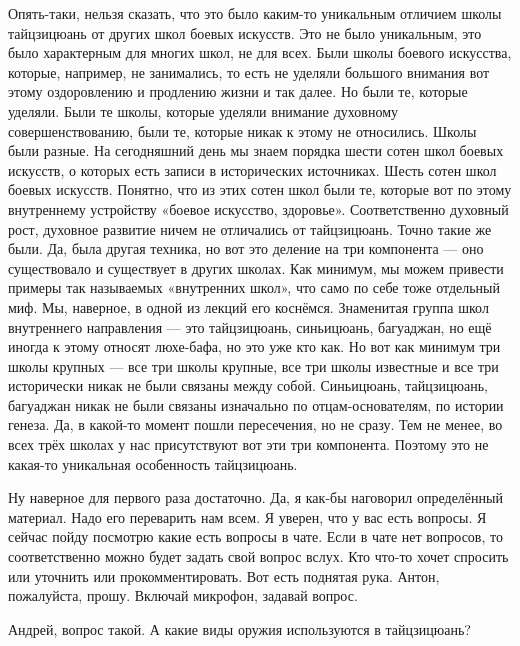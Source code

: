 Опять-таки, нельзя сказать, что это было каким-то уникальным отличием школы тайцзицюань от других
школ боевых искусств. Это не было уникальным, это было характерным для 
многих школ, не для всех. Были школы боевого искусства, которые, например, не занимались, то 
есть не уделяли большого внимания вот этому оздоровлению и продлению жизни и так далее. Но 
были те, которые уделяли. Были те школы, которые уделяли внимание духовному 
совершенствованию, были те, которые никак к этому не относились. Школы были разные. На 
сегодняшний день мы знаем порядка шести сотен школ боевых искусств, о которых есть записи в 
исторических источниках. Шесть сотен школ боевых искусств. Понятно, что из этих сотен школ 
были те, которые вот по этому внутреннему устройству «боевое искусство, здоровье».
Соответственно духовный рост, духовное развитие ничем не отличались от тайцзицюань. Точно такие же
были. Да, была другая техника, но вот это деление на три компонента --- оно 
существовало и существует в других школах. Как минимум, мы можем привести примеры так 
называемых «внутренних школ», что само по себе тоже отдельный миф. Мы, наверное, в одной из 
лекций его коснёмся. Знаменитая группа школ внутреннего направления --- это тайцзицюань, 
синьицюань, багуаджан, но ещё иногда к этому относят люхе-бафа, но это уже кто как. Но вот как 
минимум три школы крупных --- все три школы крупные, все три школы известные и все три 
исторически никак не были связаны между собой. Синьицюань, тайцзицюань, багуаджан никак 
не были связаны изначально по отцам-основателям, по истории генеза. Да, в какой-то момент пошли 
пересечения, но не сразу. Тем не менее, во всех трёх школах у нас присутствуют вот эти три 
компонента. Поэтому это не какая-то уникальная особенность тайцзицюань.

Ну наверное для 
первого раза достаточно. Да, я как-бы наговорил определённый материал. Надо его переварить нам 
всем. Я уверен, что у вас есть вопросы. Я сейчас пойду посмотрю какие есть 
вопросы в чате. Если в чате нет вопросов, то соответственно можно будет 
задать свой вопрос вслух. Кто 
что-то хочет спросить или уточнить или прокомментировать. Вот есть поднятая рука. Антон,
пожалуйста, прошу. Включай микрофон, задавай вопрос. 

Андрей, вопрос такой. А какие виды оружия используются в тайцзицюань?

